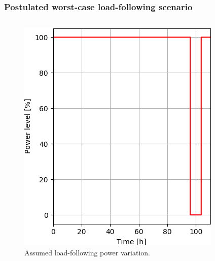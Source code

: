 \begin{frame}
\frametitle{Postulated worst-case load-following scenario}
\vspace{-6mm}
\begin{columns}
	\column[t]{5.5cm}
	\begin{figure}[t]
		\includegraphics[width=\linewidth]{./images/power_load_curve.png}
		\vspace{-6mm}
		\caption{Assumed load-following power variation.}
	\end{figure}
	

\end{columns}
\end{frame}
